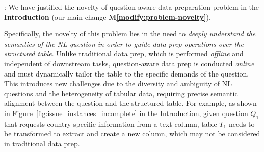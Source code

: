 : 
We have justified the novelty of question-aware data preparation problem in the \textbf{Introduction} (our main change \textbf{M\ref{modify:problem-novelty}}).

Specifically, the novelty of this problem lies in the need to \emph{deeply understand the semantics of the NL question in order to guide data prep operations over the structured table}. Unlike traditional data prep, which is performed \emph{offline} and independent of downstream tasks, question-aware data prep is conducted \emph{online} and must dynamically tailor the table to the specific demands of the question. This introduces new challenges due to the diversity and ambiguity of NL questions and the heterogeneity of tabular data, requiring precise semantic alignment between the question and the structured table.
%
For example, as shown in Figure~\ref{fig:issue_instances_incomplete} in the Introduction, given question $Q_1$ that requests country-specific information from a text column, table $T_1$ needs to be transformed to extract and create a new  column, which may not be considered in traditional data prep.

